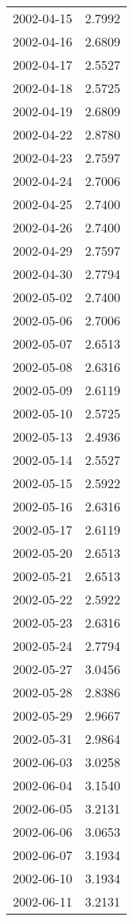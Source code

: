\begin{tabular}{lr}
2002-04-15 &      2.7992 \\
2002-04-16 &      2.6809 \\
2002-04-17 &      2.5527 \\
2002-04-18 &      2.5725 \\
2002-04-19 &      2.6809 \\
2002-04-22 &      2.8780 \\
2002-04-23 &      2.7597 \\
2002-04-24 &      2.7006 \\
2002-04-25 &      2.7400 \\
2002-04-26 &      2.7400 \\
2002-04-29 &      2.7597 \\
2002-04-30 &      2.7794 \\
2002-05-02 &      2.7400 \\
2002-05-06 &      2.7006 \\
2002-05-07 &      2.6513 \\
2002-05-08 &      2.6316 \\
2002-05-09 &      2.6119 \\
2002-05-10 &      2.5725 \\
2002-05-13 &      2.4936 \\
2002-05-14 &      2.5527 \\
2002-05-15 &      2.5922 \\
2002-05-16 &      2.6316 \\
2002-05-17 &      2.6119 \\
2002-05-20 &      2.6513 \\
2002-05-21 &      2.6513 \\
2002-05-22 &      2.5922 \\
2002-05-23 &      2.6316 \\
2002-05-24 &      2.7794 \\
2002-05-27 &      3.0456 \\
2002-05-28 &      2.8386 \\
2002-05-29 &      2.9667 \\
2002-05-31 &      2.9864 \\
2002-06-03 &      3.0258 \\
2002-06-04 &      3.1540 \\
2002-06-05 &      3.2131 \\
2002-06-06 &      3.0653 \\
2002-06-07 &      3.1934 \\
2002-06-10 &      3.1934 \\
2002-06-11 &      3.2131 \\

\end{tabular}

